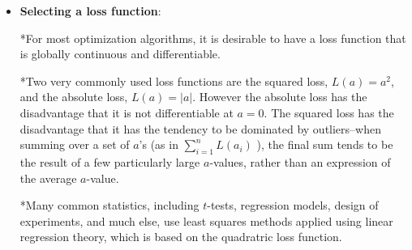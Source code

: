 \documentclass{article}
\begin{document}
\begin{itemize}
\begin{itemize}
\item {\bf Selecting a loss function}:\par

*For most optimization algorithms, it is desirable to have a loss function that is globally continuous and differentiable.\par 

*Two very commonly used loss functions are the squared loss, $L(a) = a^2$, and the absolute loss, $L(a)=|a|$. However the absolute loss has the disadvantage that it is not differentiable at $a=0$.
The squared loss has the disadvantage that it has the tendency to be dominated by outliers--when summing over a set of $a$'s (as in $\sum_{i=1}^n L(a_i)$  ), the final sum tends to be the result of a few particularly large $a$-values, rather than an expression of the average $a$-value.\par
*Many common statistics, including $t$-tests, regression models, design of experiments, and much else, use least squares methods applied using linear regression theory, which is based on the quadratric loss function.

\end{itemize}



\end{itemize}








\end{document}
